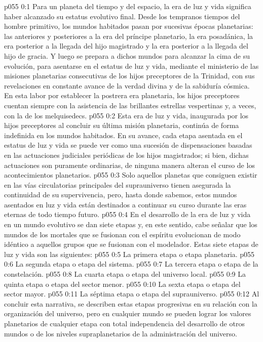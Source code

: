 \author{Mensajero poderoso}
\vs p055 0:1 Para un planeta del tiempo y del espacio, la era de luz y vida significa haber alcanzado su estatus evolutivo final. Desde los tempranos tiempos del hombre primitivo, los mundos habitados pasan por sucesivas épocas planetarias: las anteriores y posteriores a la era del príncipe planetario, la era posadánica, la era posterior a la llegada del hijo magistrado y la era posterior a la llegada del hijo de gracia. Y luego se prepara a dichos mundos para alcanzar la cima de su evolución, para asentarse en el estatus de luz y vida, mediante el ministerio de las misiones planetarias consecutivas de los hijos preceptores de la Trinidad, con sus revelaciones en constante avance de la verdad divina y de la sabiduría cósmica. En esta labor por establecer la postrera era planetaria, los hijos preceptores cuentan siempre con la asistencia de las brillantes estrellas vespertinas y, a veces, con la de los melquisedecs.
\vs p055 0:2 Esta era de luz y vida, inaugurada por los hijos preceptores al concluir su última misión planetaria, continúa de forma indefinida en los mundos habitados. En su avance, cada etapa asentada en el estatus de luz y vida se puede ver como una sucesión de dispensaciones basadas en las actuaciones judiciales periódicas de los hijos magistrados; si bien, dichas actuaciones son puramente ordinarias, de ninguna manera alteran el curso de los acontecimientos planetarios.
\vs p055 0:3 \pc Solo aquellos planetas que consiguen existir en las vías circulatorias principales del suprauniverso tienen asegurada la continuidad de su supervivencia, pero, hasta donde sabemos, estos mundos asentados en luz y vida están destinados a continuar su curso durante las eras eternas de todo tiempo futuro.
\vs p055 0:4 \pc En el desarrollo de la era de luz y vida en un mundo evolutivo se dan siete etapas y, en este sentido, cabe señalar que los mundos de los mortales que se fusionan con el espíritu evolucionan de modo idéntico a aquellos grupos que se fusionan con el modelador. Estas siete etapas de luz y vida son las siguientes:
\vs p055 0:5 La primera etapa o etapa planetaria.
\vs p055 0:6 La segunda etapa o etapa del sistema.
\vs p055 0:7 La tercera etapa o etapa de la constelación.
\vs p055 0:8 La cuarta etapa o etapa del universo local.
\vs p055 0:9 La quinta etapa o etapa del sector menor.
\vs p055 0:10 La sexta etapa o etapa del sector mayor.
\vs p055 0:11 La séptima etapa o etapa del suprauniverso.
\vs p055 0:12 \pc Al concluir esta narrativa, se describen estas etapas progresivas en su relación con la organización del universo, pero en cualquier mundo se pueden lograr los valores planetarios de cualquier etapa con total independencia del desarrollo de otros mundos o de los niveles supraplanetarios de la administración del universo.
